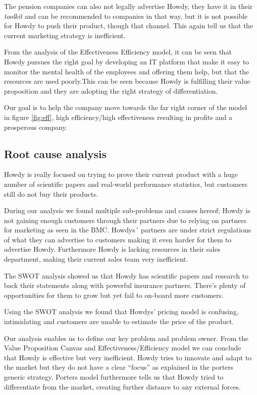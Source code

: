 \noindent The pension companies can also not legally advertise Howdy, they have it in their \textit{toolkit} and can be recommended to companies in that way, but it is not possible for Howdy to push their product, though that channel. This again tell us that the current marketing strategy is inefficient. 

\noindent From the analysis of the Effectiveness Efficiency model, it can be seen that Howdy pursues the right goal by developing an IT platform that make it easy to monitor the mental health of the employees and offering them help, but that the resources
are used poorly.This can be seen because Howdy is fulfilling their value proposition and they are adopting the right strategy of differentiation.

\noindent Our goal is to help the company move towards the far right corner of the model in figure \ref{fig:eff}, high efficiency/high effectiveness resulting in profits and a prosperous company. 


\subsection{Root cause analysis}
Howdy is really focused on trying to prove their current product with a huge number of scientific papers and real-world performance statistics, but customers still do not buy their products. 

\noindent During our analysis we found multiple sub-problems and causes hereof; Howdy is not gaining enough customers through their partners due to relying on partners for marketing as seen in the BMC. Howdys´ partners are under strict regulations of what they can advertise to customers making it even harder for them to advertise Howdy. Furthermore Howdy is lacking resources in their sales department, making their current sales team very inefficient.

\noindent The SWOT analysis showed us that Howdy has scientific papers and research to back their statements along with powerful insurance partners. There’s plenty of opportunities for them to grow but yet fail to on-board more customers.

\noindent Using the SWOT analysis we found that Howdys' pricing model is confusing, intimidating and customers are unable to estimate the price of the product.

\noindent Our analysis enables us to define our key problem and problem owner. From the Value Proposition Canvas and Effectiveness/Efficiency model we can conclude that Howdy is effective  but very inefficient. Howdy tries to innovate and adapt to the market but they do not have a clear “focus” as explained in the porters generic strategy. Porters model furthermore tells us that Howdy tried to differentiate from the market, creating further distance to any external forces\cite[p.190]{jones_george_2013}.

